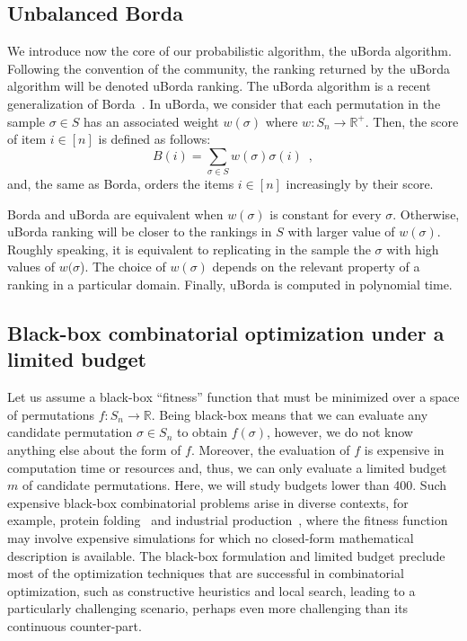 \documentclass[sigconf,dvipsnames]{acmart}
\newcommand{\FEmax}{\ensuremath{m}}
\begin{document}
\subsection{Unbalanced Borda}\label{sec:uborda}
We introduce now the core of our probabilistic algorithm, the uBorda algorithm. Following the convention of the community, the ranking returned by the uBorda algorithm will be denoted uBorda ranking. The uBorda algorithm is a recent generalization of Borda~\cite{IruLobPer2020arxiv}. In uBorda, we consider that each permutation in the sample $\sigma\in S$ has an associated weight $w(\sigma)$ where $w\colon S_n \to \mathbb{R^{+}}$. Then, the score of item $i \in [n]$ is defined as follows:
%
\begin{equation}\label{eq:uborda_score}
B(i) =  \sum_{\sigma\in S}  w(\sigma) \sigma(i) \enspace,
\end{equation}
%
and, the same as Borda, orders the items $i \in [n]$ increasingly by their score.

Borda and uBorda are equivalent when $w(\sigma)$ is constant for every $\sigma$. Otherwise, uBorda ranking will be closer to the rankings in $S$ with larger value of $w(\sigma)$. Roughly speaking, it is equivalent to replicating in the sample the $\sigma$ with high values of $w(\sigma$).
The choice of  $w(\sigma)$ depends on the relevant property of a ranking in a particular domain.
Finally, uBorda is computed in polynomial time.



\subsection{Black-box combinatorial optimization under a limited budget}

Let us assume a black-box ``fitness'' function that must be minimized over a
space of permutations $f\colon S_n \to \mathbb{R}$. Being black-box means that
we can evaluate any candidate permutation $\sigma \in S_n$ to obtain
$f(\sigma)$, however, we do not know anything else about the form of
$f$. Moreover, the evaluation of $f$ is expensive in computation time or
resources and, thus, we can only evaluate a limited budget $\FEmax$ of candidate
permutations. Here, we will study budgets lower than 400. Such expensive
black-box combinatorial problems arise in diverse contexts, for example,
protein folding~\citep{RomKraArn2012protein} and industrial
production~\citep{FerAlvDiaIglEna2014ants}, where the fitness function may
involve expensive simulations for which no closed-form mathematical description
is available. The black-box formulation and limited budget preclude most of the
optimization techniques that are successful in combinatorial optimization, such
as constructive heuristics and local search, leading to
a particularly challenging scenario, perhaps even more challenging than its continuous
counter-part.
\end{document}

